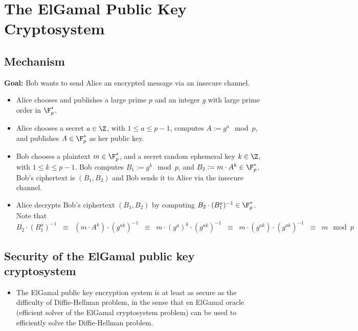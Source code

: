 
\section{The ElGamal Public Key Cryptosystem}
\setcounter{theorem}{0}
\setcounter{equation}{0}

\subsection{Mechanism}

\textbf{Goal:} Bob wants to send Alice an encrypted message via an insecure channel.
\begin{itemize}
\item	Alice chooses and publishes a large prime $p$ and an integer $g$ with large prime order in $\F_{p}^{*}$.
\item	Alice chooses a secret $a \in \Z$, with $1 \leq a \leq p - 1$, computes $A := g^{a} \mod p$, and
		publishes $A \in\F_{p}^{*}$ as her public key.
\item	Bob chooses a plaintext $m \in \F_{p}^{*}$, and a secret random ephemeral key $k \in \Z$, with $1 \leq k \leq p - 1$.
		Bob computes $B_{1} := g^{k} \mod p$, and $B_{2} := m\cdot A^{k} \in\F_{p}^{*}$.
		Bob's ciphertext is $(B_{1},B_{2})$ and Bob sends it to Alice via the insecure channel.
\item	Alice decrypts Bob's ciphertext $(B_{1},B_{2})$ by computing $B_{2}\cdot(B_{1}^{a})^{-1} \in \F_{p}^{*}$.
		Note that
		\begin{equation*}
		B_{2}\cdot(B_{1}^{a})^{-1}
		\;\; \equiv \;\; (m\cdot A^{k}) \cdot (g^{ak})^{-1}
		\;\; \equiv \;\; m\cdot (g^{a})^{k} \cdot(g^{ak})^{-1}
		\;\; \equiv \;\; m\cdot (g^{ak}) \cdot(g^{ak})^{-1}
		\;\; \equiv \;\; m \mod p
		\end{equation*}
\end{itemize}

\subsection{Security of the ElGamal public key cryptosystem}

\begin{itemize}
\item	The ElGamal public key encryption system is at least as secure as the difficulty of Diffie-Hellman problem,
		in the sense that en ElGamal oracle (efficient solver of the ElGamal cryptosystem problem) can be used
		to efficiently solve the Diffie-Hellman problem.
\end{itemize}




